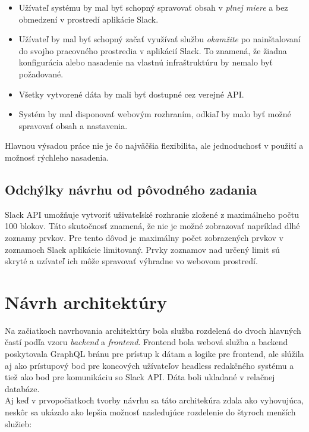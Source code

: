 \begin{itemize}
	\item Užívateľ systému by mal byť schopný spravovať obsah v \emph{plnej miere} a bez obmedzení v prostredí aplikácie Slack.
	\item Užívateľ by mal byť schopný začať využívať službu \emph{okamžite} po nainštalovaní do svojho pracovného prostredia v aplikácií Slack. To znamená, že žiadna konfigurácia alebo nasadenie na vlastnú infraštruktúru by nemalo byť požadované.
	\item Všetky vytvorené dáta by mali byť dostupné cez verejné API.
	\item Systém by mal disponovať webovým rozhraním, odkiaľ by malo byť možné spravovať obsah a nastavenia.
\end{itemize}

\noindent Hlavnou výsadou práce nie je čo najväčšia flexibilita, ale jednoduchosť v použití a možnosť rýchleho nasadenia. 

\subsection{Odchýlky návrhu od pôvodného zadania}
Slack API umožňuje vytvoriť uživateľské rozhranie zložené z maximálneho počtu 100 blokov. Táto skutočnosť znamená, že nie je možné zobrazovať napríklad dlhé zoznamy prvkov. Pre tento dôvod je maximálny počet zobrazených prvkov v zoznamoch Slack aplikácie limitovaný. Prvky zoznamov nad určený limit sú skryté a uzívateľ ich môže spravovať výhradne vo webovom prostredí. 

\section{Návrh architektúry}
Na začiatkoch navrhovania architektúry bola služba rozdelená do dvoch hlavných častí podľa vzoru \emph{backend} a \emph{frontend}. Frontend bola webová služba a backend poskytovala GraphQL bránu pre prístup k dátam a logike pre frontend, ale slúžila aj ako prístupový bod pre koncových užívateľov headless redakčného systému a tiež ako bod pre komunikáciu so Slack API. Dáta boli ukladané v relačnej databáze. \\

\noindent Aj keď v prvopočiatkoch tvorby návrhu sa táto architekúra zdala ako vyhovujúca, neskôr sa ukázalo ako lepšia možnosť nasledujúce rozdelenie do štyroch menších služieb:

